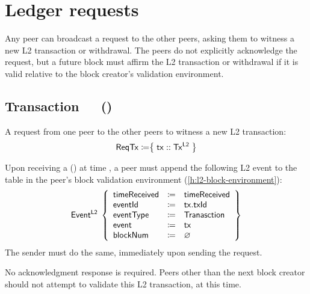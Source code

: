 \documentclass[../hydrozoa.tex]{subfiles}
\begin{document}


\section{Ledger requests}%
\label{h:l2-consensus-ledger}%

Any peer can broadcast a request to the other peers, asking them to witness a new L2 transaction or withdrawal.
The peers do not explicitly acknowledge the request, but a future block must affirm the L2 transaction or withdrawal if it is valid relative to the block creator's validation environment.

\subsection{Transaction~~~()}%
\label{h:l2-consensus-transaction}%

A request from one peer to the other peers to witness a new L2 transaction:
\begin{equation*}
  \mathsf{ReqTx} \coloneq \bigr\{\; \mathsf{tx} :: \mathsf{Tx^{L2}} \;\bigr\}
\end{equation*}

Upon receiving a () at time , a peer must append the following L2 event to the  table in the peer's block validation environment (\cref{h:l2-block-environment}):
\begin{equation*}
  \mathsf{Event^{L2}}\;\left\{
  \begin{array}{lll}
    \mathsf{timeReceived} &\coloneq& \mathsf{timeReceived} \\
    \mathsf{eventId} &\coloneq& \mathsf{tx.txId} \\
    \mathsf{eventType} &\coloneq& \mathsf{Tranasction} \\
    \mathsf{event} &\coloneq& \mathsf{tx} \\
    \mathsf{blockNum} &\coloneq& \varnothing
  \end{array}\right\}
\end{equation*}
The sender must do the same, immediately upon sending the request.

No acknowledgment response is required.
Peers other than the next block creator should not attempt to validate this L2 transaction, at this time.
\end{document}
